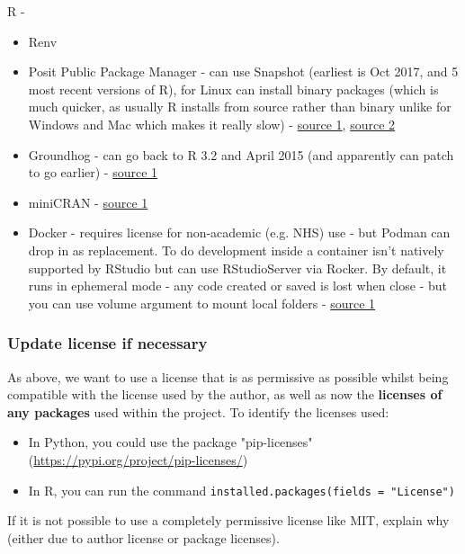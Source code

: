 R -
\begin{itemize}
    \item Renv
    \item Posit Public Package Manager - can use Snapshot (earliest is Oct 2017, and 5 most recent versions of R), for Linux can install binary packages (which is much quicker, as usually R installs from source rather than binary unlike for Windows and Mac which makes it really slow) - \href{https://packagemanager.posit.co/client/#/repos/cran/setup}{source 1}, \href{https://docs.posit.co/faq/p3m-faq/#frequently-asked-questions}{source 2}
    \item Groundhog - can go back to R 3.2 and April 2015 (and apparently can patch to go earlier) - \href{https://www.brodrigues.co/blog/2023-01-12-repro_r/}{source 1}
    \item miniCRAN - \href{https://learn.microsoft.com/en-us/sql/machine-learning/package-management/create-a-local-package-repository-using-minicran?view=sql-server-ver16}{source 1}
    \item Docker - requires license for non-academic (e.g. NHS) use - but Podman can drop in as replacement. To do development inside a container isn't natively supported by RStudio but can use RStudioServer via Rocker. By default, it runs in ephemeral mode - any code created or saved is lost when close - but you can use volume argument to mount local folders - \href{https://towardsdatascience.com/running-rstudio-inside-a-container-e9db5e809ff8}{source 1}
\end{itemize}

\subsubsection{Update license if necessary}
\timeyes

As above, we want to use a license that is as permissive as possible whilst being compatible with the license used by the author, as well as now the \textbf{licenses of any packages} used within the project. To identify the licenses used:
\begin{itemize}
    \item In Python, you could use the package "pip-licenses" (\url{https://pypi.org/project/pip-licenses/})
    \item In R, you can run the command \texttt{installed.packages(fields = "License")}
\end{itemize}

If it is not possible to use a completely permissive license like MIT, explain why (either due to author license or package licenses).

